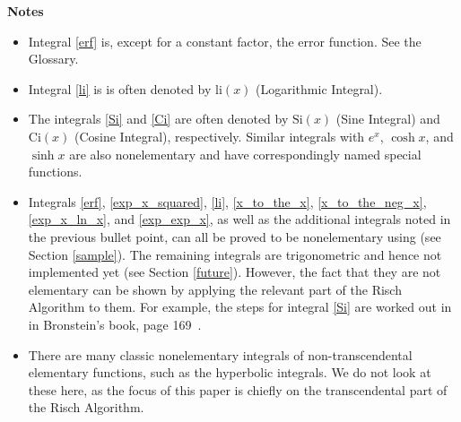 \textbf{Notes}
\begin{itemize}
\item Integral \ref{erf} is, except for a constant factor, the
\gls{error function}.  See the Glossary.
\item Integral \ref{li} is is often denoted by $\mathrm{li}(x)$
(Logarithmic Integral).
\item The integrals \ref{Si} and \ref{Ci} are often denoted by
$\mathrm{Si}(x)$ (Sine Integral) and $\mathrm{Ci}(x)$ (Cosine Integral),
respectively.  Similar integrals with $e^x$, $\cosh{x}$, and $\sinh{x}$
are also nonelementary and have correspondingly named special functions.

\item Integrals \ref{erf}, \ref{exp_x_squared}, \ref{li},
\ref{x_to_the_x}, \ref{x_to_the_neg_x}, \ref{exp_x_ln_x}, and
\ref{exp_exp_x}, as well as the additional integrals noted in the
previous bullet point, can all be proved to be nonelementary using
\rischintegrate{} (see Section \ref{sample}). The remaining integrals
are trigonometric and hence not implemented yet (see Section
\ref{future}).  However, the fact that they are not \gls{elementary}
can be shown by applying the relevant part of the Risch Algorithm to
them. For example, the steps  for integral \ref{Si} are worked out in in
Bronstein's book, page 169~\cite{bronstein2005symbolic}.

\item There are many classic nonelementary integrals of
non-\gls{transcendental} \gls{elementary} functions, such as the hyperbolic
integrals.  We do not look at these here, as the focus of this paper is
chiefly on the \gls{transcendental} part of the Risch Algorithm.
\end{itemize}